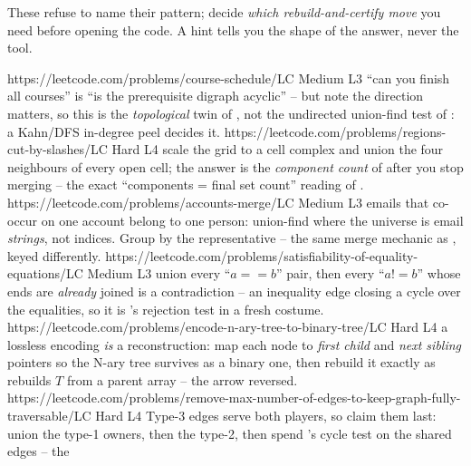 
These refuse to name their pattern; decide \emph{which rebuild-and-certify move} you need before
opening the code. A hint tells you the shape of the answer, never the tool.

\begin{mixedset}
    {https://leetcode.com/problems/course-schedule/}{LC Medium L3}
    {``can you finish all courses'' is ``is the prerequisite digraph acyclic'' -- but note the
    direction matters, so this is the \emph{topological} twin of , not the
    undirected union-find test of : a Kahn/DFS in-degree peel decides it.}
    {https://leetcode.com/problems/regions-cut-by-slashes/}{LC Hard L4}
    {scale the grid to a cell complex and union the four neighbours of every open cell; the answer
    is the \emph{component count} of  after you stop merging -- the exact
    ``components = final set count'' reading of .}
    {https://leetcode.com/problems/accounts-merge/}{LC Medium L3}
    {emails that co-occur on one account belong to one person: union-find where the universe is
    email \emph{strings}, not indices. Group by the  representative -- the same merge
    mechanic as , keyed differently.}
    {https://leetcode.com/problems/satisfiability-of-equality-equations/}{LC Medium L3}
    {union every ``$a==b$'' pair, then every ``$a!=b$'' whose ends are \emph{already} joined is a
    contradiction -- an inequality edge closing a cycle over the equalities, so it is
    's rejection test in a fresh costume.}
    {https://leetcode.com/problems/encode-n-ary-tree-to-binary-tree/}{LC Hard L4}
    {a lossless encoding \emph{is} a reconstruction: map each node to \emph{first child} and
    \emph{next sibling} pointers so the N-ary tree survives as a binary one, then rebuild it exactly
    as  rebuilds $T$ from a parent array -- the arrow reversed.}
    {https://leetcode.com/problems/remove-max-number-of-edges-to-keep-graph-fully-traversable/}{LC Hard L4}
    {Type-3 edges serve both players, so claim them last: union the type-1 owners, then
    the type-2, then spend 's cycle test on the shared edges -- the
}
\end{mixedset}
